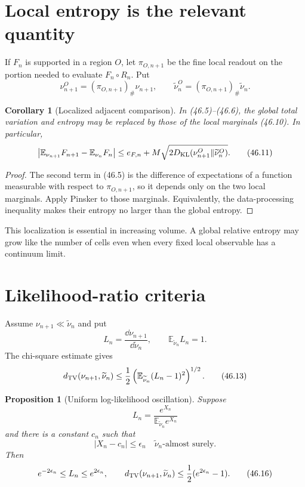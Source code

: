 \documentclass[11pt]{article}
\newtheorem{proposition}[theorem]{Proposition}
\newtheorem{corollary}[theorem]{Corollary}
\theoremstyle{remark}
\begin{document}
\section{Local entropy is the relevant quantity}

If \(F_n\) is supported in a region \(O\), let
\(\pi_{O,n+1}\) be the fine local readout on the portion needed to
evaluate \(F_n\circ R_n\).  Put
\[
 \nu_{n+1}^O=(\pi_{O,n+1})_\#\nu_{n+1},\qquad
 \widetilde\nu_n^O=(\pi_{O,n+1})_\#\widetilde\nu_n.      \tag{46.10}
\]

\begin{corollary}[Localized adjacent comparison]
\label{cor:v15v46-local}
In (46.5)--(46.6), the global total variation and entropy may be
replaced by those of the local marginals (46.10).  In particular,
\[
 \left|\mathbb E_{\nu_{n+1}}F_{n+1}
       -\mathbb E_{\nu_n}F_n\right|
 \leq e_{F,n}
 +M\sqrt{2D_{\rm KL}(\nu_{n+1}^O
                     \Vert\widetilde\nu_n^O)}.           \tag{46.11}
\]
\end{corollary}

\begin{proof}
The second term in (46.5) is the difference of expectations of a
function measurable with respect to \(\pi_{O,n+1}\), so it depends
only on the two local marginals.  Apply Pinsker to those marginals.
Equivalently, the data-processing inequality makes their entropy no
larger than the global entropy.
\end{proof}

This localization is essential in increasing volume.  A global
relative entropy may grow like the number of cells even when every
fixed local observable has a continuum limit.

\section{Likelihood-ratio criteria}

Assume
\(\nu_{n+1}\ll\widetilde\nu_n\) and put
\[
 L_n=\frac{\dd\nu_{n+1}}{\dd\widetilde\nu_n},\qquad
 \mathbb E_{\widetilde\nu_n}L_n=1.                      \tag{46.12}
\]
The chi-square estimate gives
\[
 d_{\rm TV}(\nu_{n+1},\widetilde\nu_n)
 \leq\frac12
 \left(\mathbb E_{\widetilde\nu_n}(L_n-1)^2\right)^{1/2}.
                                                               \tag{46.13}
\]

\begin{proposition}[Uniform log-likelihood oscillation]
\label{prop:v15v46-oscillation}
Suppose
\[
 L_n=\frac{e^{X_n}}
           {\mathbb E_{\widetilde\nu_n}e^{X_n}}          \tag{46.14}
\]
and there is a constant \(c_n\) such that
\[
 |X_n-c_n|\leq\epsilon_n
 \quad\widetilde\nu_n\text{-almost surely}.              \tag{46.15}
\]
Then
\[
 e^{-2\epsilon_n}\leq L_n\leq e^{2\epsilon_n},\qquad
 d_{\rm TV}(\nu_{n+1},\widetilde\nu_n)
 \leq\frac12(e^{2\epsilon_n}-1).                        \tag{46.16}
\]
\end{proposition}
\end{document}
